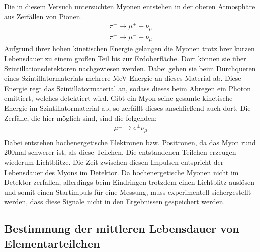 %
Die in diesem Versuch untersuchten Myonen entstehen in der oberen Atmosphäre aus Zerfällen von Pionen.
%
\begin{align}
  \pi^+\rightarrow\mu^++\nu_\mu \\
  \pi^-\rightarrow\mu^-+\bar{\nu}_\mu
\end{align}
%
Aufgrund ihrer hohen kinetischen Energie gelangen die Myonen trotz hrer kurzen Lebensdauer zu einem großen Teil bis zur
Erdoberfläche. Dort können sie über Szintillationsdetektoren nachgewiesen werden. Dabei geben sie beim Durchqueren eines
Szintillatormaterials mehrere MeV Energie an dieses Material ab. Diese Energie regt das Szintillatormaterial an, sodass dieses beim Abregen ein Photon emittiert, welches detektiert wird.
Gibt ein Myon seine gesamte kinetische Energie im Szintillatormaterial ab, so zerfällt dieses anschließend auch dort. Die Zerfälle, die hier möglich sind, sind die folgenden:
%
\begin{align}
  \mu^\pm\rightarrow e^\pm\nu_\mu \\
\end{align}
%
Dabei entstehen hochenergetische Elektronen bzw. Positronen, da das Myon rund 200mal schwerer ist, als diese Teilchen.
Die entstandenen Teilchen erzeugen wiederum Lichtblitze. Die Zeit zwischen diesen Impulsen entspricht der Lebensdauer
des Myons im Detektor. Da hochenergetische Myonen nicht im Detektor zerfallen, allerdings beim Eindringen trotzdem einen
Lichtblitz auslösen und somit einen Startimpuls für eine Messung, muss experimentell sichergestellt werden, dass diese
Signale nicht in den Ergebnissen gespeichert werden.
%
\subsection{Bestimmung der mittleren Lebensdauer von Elementarteilchen}

